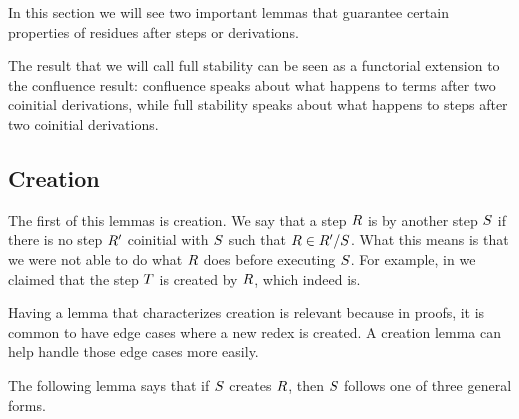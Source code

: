 

In this section we will see two important lemmas that guarantee certain properties
of residues after steps or derivations.

The result that we will call full stability can be seen as a functorial extension
to the confluence result: confluence speaks about what happens to terms after
two coinitial derivations,
while full stability speaks about what happens to steps after two coinitial derivations.

\subsection*{Creation}

The first of this lemmas is creation.
We say that a step $R$ is  by another step $S$ if
there is no step $R'$ coinitial with $S$ such that $R \in R' / S$.
What this means is that we were not able to do what $R$ does before executing $S$.
For example, in  we claimed
that the step $T$ is created by $R$, which indeed is.

Having a lemma that characterizes creation is relevant because in proofs,
it is common to have edge cases where a new redex is created.
A creation lemma can help handle those edge cases more easily.

The following lemma says that if $S$ creates $R$, then $S$ follows
one of three general forms.



